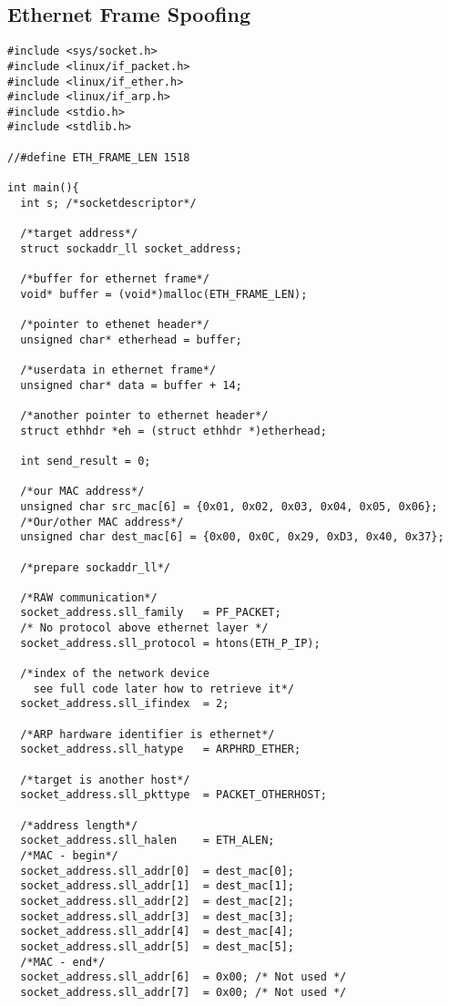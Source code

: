 \documentclass[a4paper,12pt]{article}
\begin{document}
\subsection{Ethernet Frame Spoofing}
\label{ch:EthSpoof}
\begin{verbatim}
#include <sys/socket.h>
#include <linux/if_packet.h>
#include <linux/if_ether.h>
#include <linux/if_arp.h>
#include <stdio.h>
#include <stdlib.h>

//#define ETH_FRAME_LEN 1518

int main(){
  int s; /*socketdescriptor*/

  /*target address*/
  struct sockaddr_ll socket_address;
  
  /*buffer for ethernet frame*/
  void* buffer = (void*)malloc(ETH_FRAME_LEN);
  
  /*pointer to ethenet header*/
  unsigned char* etherhead = buffer;
  
  /*userdata in ethernet frame*/
  unsigned char* data = buffer + 14;
  
  /*another pointer to ethernet header*/
  struct ethhdr *eh = (struct ethhdr *)etherhead;
  
  int send_result = 0;
  
  /*our MAC address*/
  unsigned char src_mac[6] = {0x01, 0x02, 0x03, 0x04, 0x05, 0x06};
  /*Our/other MAC address*/
  unsigned char dest_mac[6] = {0x00, 0x0C, 0x29, 0xD3, 0x40, 0x37};
  
  /*prepare sockaddr_ll*/
  
  /*RAW communication*/
  socket_address.sll_family   = PF_PACKET;	
  /* No protocol above ethernet layer */
  socket_address.sll_protocol = htons(ETH_P_IP);	
  
  /*index of the network device
    see full code later how to retrieve it*/
  socket_address.sll_ifindex  = 2;
  
  /*ARP hardware identifier is ethernet*/
  socket_address.sll_hatype   = ARPHRD_ETHER;
  
  /*target is another host*/
  socket_address.sll_pkttype  = PACKET_OTHERHOST;
  
  /*address length*/
  socket_address.sll_halen    = ETH_ALEN;		
  /*MAC - begin*/
  socket_address.sll_addr[0]  = dest_mac[0];		
  socket_address.sll_addr[1]  = dest_mac[1];		
  socket_address.sll_addr[2]  = dest_mac[2];
  socket_address.sll_addr[3]  = dest_mac[3];
  socket_address.sll_addr[4]  = dest_mac[4];
  socket_address.sll_addr[5]  = dest_mac[5];
  /*MAC - end*/
  socket_address.sll_addr[6]  = 0x00; /* Not used */
  socket_address.sll_addr[7]  = 0x00; /* Not used */
  

\end{verbatim}
\end{document}
